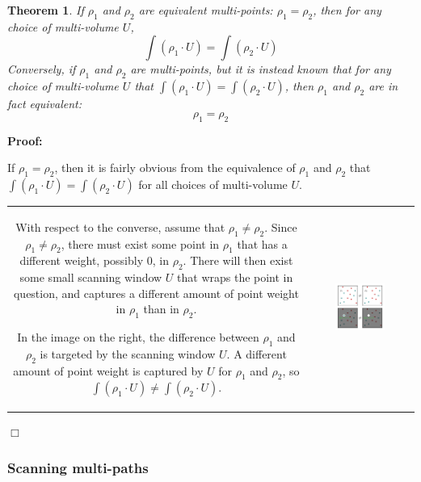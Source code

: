 \documentclass{book}
\newtheorem{thm}{Theorem}
\begin{document}
\begin{thm}
If \(\rho_1\) and \(\rho_2\) are equivalent multi-points: \(\rho_1 = \rho_2\), then for any choice of multi-volume \(U\), 
\[\int (\rho_1 \cdot U) = \int (\rho_2 \cdot U)\]
Conversely, if \(\rho_1\) and \(\rho_2\) are multi-points, but it is instead known that for any choice of multi-volume \(U\) that 
\(\int (\rho_1 \cdot U) = \int (\rho_2 \cdot U)\), then \(\rho_1\) and \(\rho_2\) are in fact equivalent:
\[\rho_1 = \rho_2\]  
\end{thm}
\textbf{Proof:}

If \(\rho_1 = \rho_2\), then it is fairly obvious from the equivalence of \(\rho_1\) and \(\rho_2\) that \(\int (\rho_1 \cdot U) = \int (\rho_2 \cdot U)\) for all choices of multi-volume \(U\). 

\begin{tabular}{cc}
\parbox{0.5\textwidth}{
With respect to the converse, assume that \(\rho_1 \neq \rho_2\). Since \(\rho_1 \neq \rho_2\), there must exist some point in \(\rho_1\) that has a different weight, possibly \(0\), in \(\rho_2\). There will then exist some small scanning window \(U\) that wraps the point in question, and captures a different amount of point weight in \(\rho_1\) than in \(\rho_2\).

In the image on the right, the difference between \(\rho_1\) and \(\rho_2\) is targeted by the scanning window \(U\). A different amount of point weight is captured by \(U\) for \(\rho_1\) and \(\rho_2\), so \(\int (\rho_1 \cdot U) \neq \int (\rho_2 \cdot U)\).
} & \parbox{0.5\textwidth}{
\includegraphics[width = 0.5\textwidth]{Point_totals/scanning_points_using_volumes}
}
\end{tabular}

\(\Box\)

\subsubsection{Scanning multi-paths}
\end{document}
